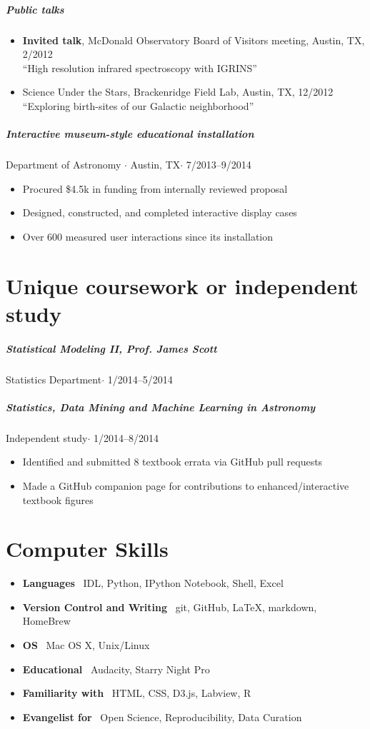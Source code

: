 \documentclass[10pt,letterpaper]{article}
\begin{document}
\subparagraph{Public talks}
	\begin{itemize}
	    \item \textbf{Invited talk}, McDonald Observatory Board of Visitors meeting, Austin, TX, 2/2012 \\
	    ``High resolution infrared spectroscopy with IGRINS'' 
	    \item Science Under the Stars, Brackenridge Field Lab, Austin, TX, 12/2012 \\
	    ``Exploring birth-sites of our Galactic neighborhood'' 
	\end{itemize}

\subparagraph{Interactive museum-style educational installation}
Department of Astronomy $\cdot$ Austin, TX$\cdot$ 7/2013--9/2014
	\begin{itemize}
	    \item Procured \$4.5k in funding from internally reviewed proposal
	    \item Designed, constructed, and completed interactive display cases
	    \item Over 600 measured user interactions since its installation
	\end{itemize}

\section*{Unique coursework or independent study}

\subparagraph{Statistical Modeling II, Prof. James Scott}
Statistics Department$\cdot$ 1/2014--5/2014

\subparagraph{Statistics, Data Mining and Machine Learning in Astronomy}
Independent study$\cdot$ 1/2014--8/2014
	\begin{itemize}
	    \item Identified and submitted 8 textbook errata via GitHub pull requests
	    \item Made a GitHub companion page for contributions to enhanced/interactive textbook figures
	\end{itemize}
	
\section*{Computer Skills}

\begin{itemize}
    \item \textbf{Languages} \ IDL, Python, IPython Notebook, Shell, Excel
    \item \textbf{Version Control and Writing} \ git, GitHub, \LaTeX, markdown, HomeBrew
    \item \textbf{OS} \ Mac OS X, Unix/Linux
    \item \textbf{Educational} \ Audacity, Starry Night Pro
    \item \textbf{Familiarity with} \ HTML, CSS, D3.js, Labview, R
    \item \textbf{Evangelist for} \ Open Science, Reproducibility, Data Curation
\end{itemize}
\end{document}
